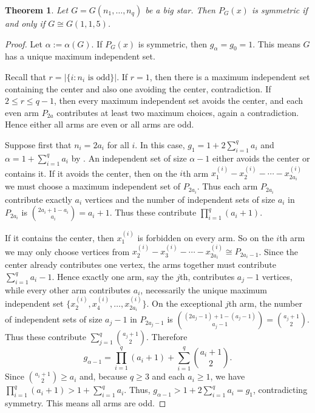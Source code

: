 \documentclass[10pt,a4paper]{amsart}
\newtheorem{thm}{Theorem}
\begin{document}
\begin{thm}\label{prop:big_star_symmetry}
Let \(G=G(n_1,\ldots,n_q)\) be a big star. Then \(P_G(x)\) is symmetric if and only if $G\cong G(1,1,5)$.
\end{thm}

\begin{proof}
Let $\alpha:=\alpha(G)$. If \(P_G(x)\) is symmetric, then \(g_{\alpha}=g_0=1\). This means \(G\) has a unique
maximum independent set.  


Recall that  \(r=|\{ i : n_i \text{ is odd} \}|\).  If \(r=1\), then there is a maximum independent set containing the center and also one
avoiding the center, contradiction. If \(2\le r\le q-1\), then every maximum independent
set avoids the center, and each even arm \(P_{2a}\) contributes at least two maximum
choices, again a contradiction. Hence either all arms are even or all arms are odd.

Suppose first that \(n_i=2a_i\) for all \(i\). In this case, $g_1=1+2\sum_{i=1}^q a_i$ and    $\alpha=1+\sum_{i=1}^q a_i$ by . An independent set of size \(\alpha-1\) either avoids the center or contains it. If it avoids the center, then on the \(i\)th arm $x^{(i)}_1-x^{(i)}_2-\cdots-x^{(i)}_{2a_i}$
we must choose a maximum independent set of \(P_{2a_i}\). Thus each arm $P_{2a_i}$ contribute exactly $a_i$ vertices and the number of independent sets of size $a_i$ in $P_{2a_i}$ is $\binom{2a_i+1-a_i}{a_i}=a_i+1$. Thus these contribute $\prod_{i=1}^q (a_i+1)$.

If it contains the center, then \(x^{(i)}_1\) is forbidden on every arm. So on the \(i\)th arm we may only choose vertices from $x^{(i)}_2-x^{(i)}_3-\cdots-x^{(i)}_{2a_i}\cong P_{2a_i-1}$.
Since the center already contributes one vertex, the arms together must contribute \(\sum_{i=1}^q a_i-1\). Hence exactly one arm, say the \(j\)th, contributes \(a_j-1\) vertices, while every other arm contributes \(a_i\), necessarily the unique maximum independent set $\{x^{(i)}_2,x^{(i)}_4,\ldots,x^{(i)}_{2a_i}\}$. 
On the exceptional \(j\)th arm, the number of independent sets of size \(a_j-1\) in \(P_{2a_j-1}\) is $\binom{(2a_j-1) +1- (a_j-1)}{a_j-1}= \binom{a_j+1}{2}$. 
Thus these contribute $\sum_{j=1}^q \binom{a_j+1}{2}$. Therefore
\[
g_{\alpha-1}
=
\prod_{i=1}^q (a_i+1)+\sum_{i=1}^q \binom{a_i+1}{2}.
\]
Since \(\binom{a_i+1}{2}\ge a_i\) and, because \(q\ge 3\) and each \(a_i\ge 1\), we have $\prod_{i=1}^q (a_i+1)>1+\sum_{i=1}^q a_i$.  Thus, $g_{\alpha-1}>1+2\sum_{i=1}^q a_i=g_1$,
contradicting symmetry. This means all arms are odd. 


\end{proof}
\end{document}
